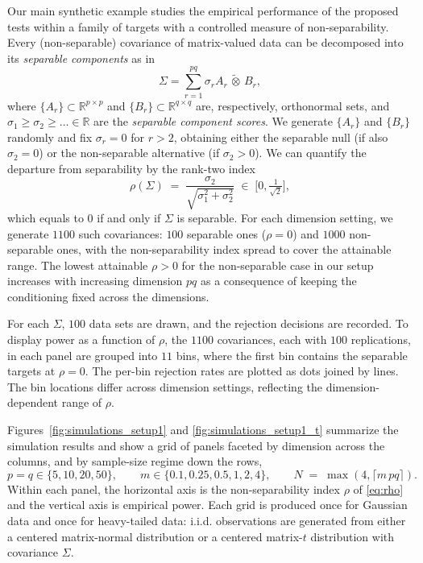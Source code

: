 \documentclass[12pt]{article}
\newcommand{\R}{\mathbb{R}}
\newcommand{\ot}{\,\tilde\otimes\,}
\begin{document}
Our main synthetic example studies the empirical performance of the proposed tests within a family of targets with a controlled measure of non-separability. Every (non-separable) covariance of matrix-valued data can be decomposed into its \emph{separable components} \citep{masak2023separable} as in
\[
\Sigma = \sum_{r=1}^{pq} \sigma_r A_r \ot B_r,
\]
where $\{A_r\} \subset \R^{p \times p}$ and $\{B_r\} \subset \R^{q \times q}$ are, respectively, orthonormal sets, and $\sigma_1 \geq \sigma_2 \geq \ldots \in \R$ are the \emph{separable component scores}. We generate $\{A_r\}$ and $\{B_r\}$ randomly and fix $\sigma_r=0$ for $r > 2$, obtaining either the separable null (if also $\sigma_2=0$) or the non-separable alternative (if $\sigma_2>0$). We can quantify the departure from separability by the rank-two index
\begin{equation}
  \rho(\Sigma) \;=\; \frac{\sigma_2}{\sqrt{\sigma_1^2+\sigma_2^2}}
          \;\in\;\big[0,\tfrac{1}{\sqrt 2}\big],
  \label{eq:rho}
\end{equation}
which equals to 0 if and only if $\Sigma$ is separable.
For each dimension setting, we generate $1100$ such covariances: $100$ separable ones ($\rho=0$) and $1000$ non-separable ones, with the non-separability index spread to cover the attainable range. The lowest attainable $\rho > 0$ for the non-separable case in our setup increases with increasing dimension $pq$ as a consequence of keeping the conditioning fixed across the dimensions.

For each $\Sigma$, $100$ data sets are drawn, and the rejection decisions are recorded. To display power as a function of $\rho$, the $1100$ covariances, each with $100$ replications, in each panel are grouped into $11$ bins, where the first bin contains the separable targets at $\rho=0$. The per-bin rejection rates are plotted as dots joined by lines. The bin locations differ across dimension settings, reflecting the dimension-dependent range of $\rho$.


Figures~\ref{fig:simulations_setup1} and \ref{fig:simulations_setup1_t} summarize the simulation results and show a grid of panels faceted by dimension across the columns, and by sample-size regime down the rows,
\begin{equation*}
  p=q\in\{5,10,20,50\}, \qquad m\in\{0.1,0.25,0.5,1,2,4\}, \qquad N \;=\; \max(4,\lceil m\,pq \rceil) .
\end{equation*}
Within each panel, the horizontal axis is the non-separability index $\rho$ of \eqref{eq:rho} and the vertical axis is empirical power. Each grid is produced once for Gaussian data and once for heavy-tailed data: i.i.d. observations are generated from either a centered matrix-normal distribution \citep{gupta2018} or a centered matrix-$t$ distribution \citep{thompson2020classification} with covariance $\Sigma$.
\end{document}
